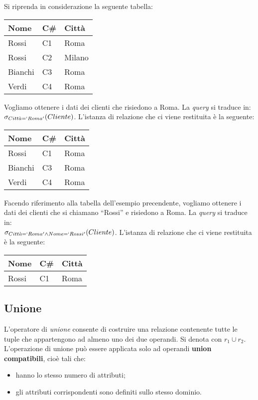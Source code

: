\begin{exmp}
 Si riprenda in considerazione la seguente tabella:
 \begin{center}
\begin{tabular}{l |l | l}
  Nome & C\# & Città\\
  \hline
  Rossi & C1 & Roma\\
  Rossi & C2 & Milano\\
  Bianchi & C3 & Roma\\
  Verdi & C4 & Roma\\
\end{tabular}
\end{center}
Vogliamo ottenere i dati dei clienti che risiedono a Roma. La \emph{query}
si traduce in:\\$\sigma_{Citt\grave{a}=`Roma'}(Cliente)$. L'istanza di relazione che ci 
viene restituita è la seguente:
 \begin{center}
\begin{tabular}{l |l | l}
  Nome & C\# & Città\\
  \hline
  Rossi & C1 & Roma\\
  Bianchi & C3 & Roma\\
  Verdi & C4 & Roma\\
\end{tabular}
\end{center}
\end{exmp}
\begin{exmp}
Facendo riferimento alla tabella dell'esempio precendente, vogliamo ottenere i dati dei  
clienti che si chiamano ``Rossi'' e risiedono a Roma. La \emph{query}
si traduce in: \\$\sigma_{Citt\grave{a}=`Roma'\wedge Nome=`Rossi'}(Cliente)$. L'istanza 
di relazione che ci viene restituita è la seguente:
\begin{center}
\begin{tabular}{l |l | l}
  Nome & C\# & Città\\
  \hline
  Rossi & C1 & Roma\\
 \end{tabular}
 \end{center}
\end{exmp}

\subsection{Unione}
L'operatore di \emph{unione} consente di costruire una relazione contenente tutte
le tuple che appartengono ad almeno uno dei due operandi. Si denota con $r_1 \cup r_2$.
L'operazione di unione può essere applicata solo ad operandi \textbf{union compatibili},
cioè tali che:
\begin{itemize}
 \item hanno lo stesso numero di attributi;
 \item gli attributi corrispondenti sono definiti sullo stesso dominio.
\end{itemize}

